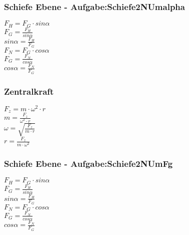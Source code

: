 \subsubsection{Schiefe Ebene - Aufgabe:Schiefe2NUmalpha} 
\begin{minipage}{0.45\textwidth} 
$ F_{H}  = F_{G} \cdot sin \alpha $\\ 
$ F_{G}  = \frac{ F_{H} }{sin \alpha } $\\ 
$ sin \alpha  = \frac{F_{H} }{F_{G} } $\\ 
$ F_{N}  = F_{G} \cdot cos \alpha $\\ 
$ F_{G}  = \frac{ F_{N} }{cos \alpha } $\\ 
$ cos \alpha  = \frac{F_{N} }{F_{G} } $\\ 
\end{minipage} 
\begin{minipage}{0.45\textwidth} 
 
\end{minipage} 
\subsubsection{Zentralkraft} 
\begin{minipage}{0.45\textwidth} 
$ F_{z}  = m\cdot \omega ^{2} \cdot r $\\ 
$ m = \frac{ F_{z} }{\omega ^{2} \cdot r} $\\ 
$ \omega  = \sqrt{\frac{ F_{z} }{m\cdot r}} $\\ 
$ r = \frac{ F_{z} }{m\cdot \omega ^{2} } $\\ 
\end{minipage} 
\begin{minipage}{0.45\textwidth} 
 
\end{minipage} 
\subsubsection{Schiefe Ebene - Aufgabe:Schiefe2NUmFg} 
\begin{minipage}{0.45\textwidth} 
$ F_{H}  = F_{G} \cdot sin \alpha $\\ 
$ F_{G}  = \frac{ F_{H} }{sin \alpha } $\\ 
$ sin \alpha  = \frac{F_{H} }{F_{G} } $\\ 
$ F_{N}  = F_{G} \cdot cos \alpha $\\ 
$ F_{G}  = \frac{ F_{N} }{cos \alpha } $\\ 
$ cos \alpha  = \frac{F_{N} }{F_{G} } $\\ 
\end{minipage} 
\begin{minipage}{0.45\textwidth} 
 
\end{minipage} 
